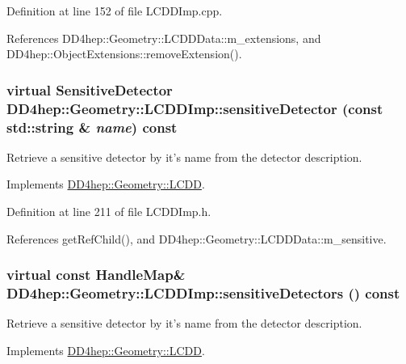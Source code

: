 Definition at line 152 of file LCDDImp.cpp.

References DD4hep::Geometry::LCDDData::m\_\-extensions, and DD4hep::ObjectExtensions::removeExtension().\hypertarget{class_d_d4hep_1_1_geometry_1_1_l_c_d_d_imp_ac67b0ebe0d7ccb694c0d7a9e53cb4662}{
\subsubsection[{sensitiveDetector}]{\setlength{\rightskip}{0pt plus 5cm}virtual {\bf SensitiveDetector} DD4hep::Geometry::LCDDImp::sensitiveDetector (const std::string \& {\em name}) const}}
\label{class_d_d4hep_1_1_geometry_1_1_l_c_d_d_imp_ac67b0ebe0d7ccb694c0d7a9e53cb4662}


Retrieve a sensitive detector by it's name from the detector description. 

Implements \hyperlink{class_d_d4hep_1_1_geometry_1_1_l_c_d_d_af476b8241b93e82350ec1e5cbf145941}{DD4hep::Geometry::LCDD}.

Definition at line 211 of file LCDDImp.h.

References getRefChild(), and DD4hep::Geometry::LCDDData::m\_\-sensitive.\hypertarget{class_d_d4hep_1_1_geometry_1_1_l_c_d_d_imp_a493e9d19391553cb1ce589dbc5248904}{
\subsubsection[{sensitiveDetectors}]{\setlength{\rightskip}{0pt plus 5cm}virtual const {\bf HandleMap}\& DD4hep::Geometry::LCDDImp::sensitiveDetectors () const}}
\label{class_d_d4hep_1_1_geometry_1_1_l_c_d_d_imp_a493e9d19391553cb1ce589dbc5248904}


Retrieve a sensitive detector by it's name from the detector description. 

Implements \hyperlink{class_d_d4hep_1_1_geometry_1_1_l_c_d_d_a576c24cc18698eb14658466999fca65d}{DD4hep::Geometry::LCDD}.

